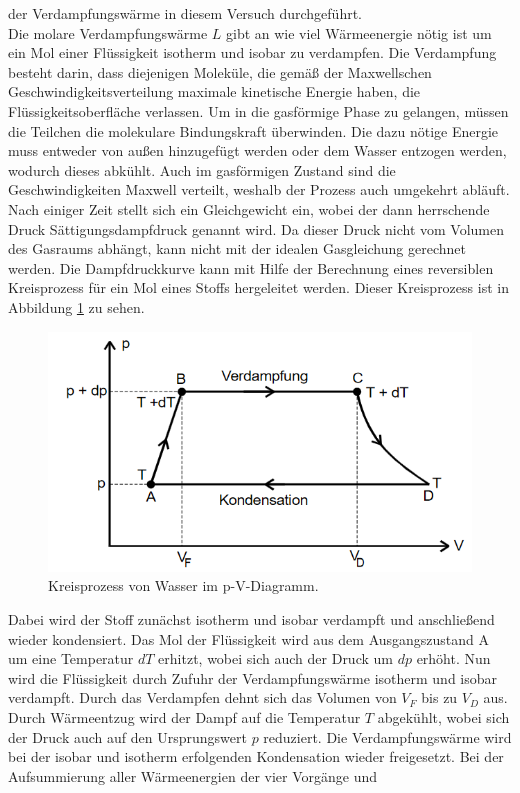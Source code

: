 der Verdampfungswärme in diesem Versuch durchgeführt. 
\\
Die molare Verdampfungswärme $L$ gibt an wie viel Wärmeenergie nötig ist um ein Mol einer Flüssigkeit isotherm und isobar zu verdampfen. 
Die Verdampfung besteht darin, dass diejenigen Moleküle, die gemäß der Maxwellschen Geschwindigkeitsverteilung maximale kinetische Energie haben, die Flüssigkeitsoberfläche verlassen.
Um in die gasförmige Phase zu gelangen, müssen die Teilchen die molekulare Bindungskraft überwinden. Die dazu nötige Energie muss entweder von außen hinzugefügt werden oder dem Wasser entzogen werden, wodurch dieses abkühlt.
Auch im gasförmigen Zustand sind die Geschwindigkeiten Maxwell verteilt, weshalb der Prozess auch umgekehrt abläuft. Nach einiger Zeit stellt sich ein Gleichgewicht ein, wobei der dann herrschende Druck 
Sättigungsdampfdruck genannt wird. Da dieser Druck nicht vom Volumen des Gasraums abhängt, kann nicht mit der idealen Gasgleichung gerechnet werden.
Die Dampfdruckkurve kann mit Hilfe der Berechnung eines reversiblen Kreisprozess für ein Mol eines Stoffs hergeleitet werden. Dieser Kreisprozess ist in Abbildung \ref{fig:kreis} zu sehen.
\begin{figure}
    \centering
    \caption{Kreisprozess von Wasser im p-V-Diagramm.\cite{v203}}
    \label{fig:kreis}
    \includegraphics[width = 0.6 \textwidth]{pics/kreis.png}
\end{figure}
Dabei wird der Stoff zunächst isotherm und isobar verdampft und anschließend wieder kondensiert. Das Mol der Flüssigkeit wird aus dem Ausgangszustand A um eine Temperatur
$dT$ erhitzt, wobei sich auch der Druck um $dp$ erhöht. Nun wird die Flüssigkeit durch Zufuhr der Verdampfungswärme isotherm und isobar verdampft. Durch das Verdampfen
dehnt sich das Volumen von $V_F$ bis zu $V_D$ aus. Durch Wärmeentzug wird der Dampf auf die Temperatur $T$ abgekühlt, wobei sich der Druck auch auf den Ursprungswert $p$ reduziert.
Die Verdampfungswärme wird bei der isobar und isotherm erfolgenden Kondensation wieder freigesetzt. Bei der Aufsummierung aller Wärmeenergien der vier Vorgänge und
